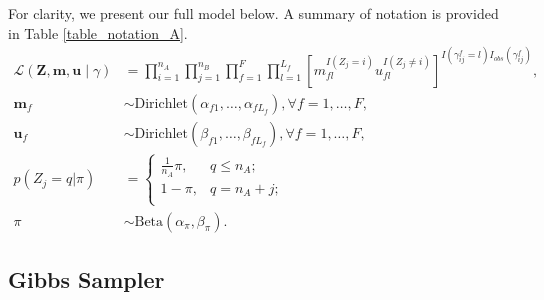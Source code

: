 \documentclass[ba]{imsart}
\begin{document}
For clarity, we present our full model below. A summary of notation is provided in Table \ref{table_notation_A}.
\begin{subequations}
\begin{align}
	\mathcal{L}(\bm{Z}, \bm{m}, \bm{u} \mid \gamma) &= \prod_{i=1}^{n_A}  \prod_{j=1}^{n_B}\prod_{f=1}^{F}\prod_{l=1}^{L_f}\left[  m_{fl}^{I(Z_j = i)}u_{fl}^{I(Z_j \neq i)}\right]^{I(\gamma_{ij}^f = l)I_{obs}(\gamma_{ij}^f)}, \label{eqn:likelihood}\\
	\bm{m}_f &\sim \text{Dirichlet}(\alpha_{f1}, \ldots, \alpha_{f L_f}), \forall f = 1, \ldots, F, \label{eqn:m} \\
	\bm{u}_f &\sim \text{Dirichlet}(\beta_{f1}, \ldots, \beta_{f L_f}),\forall f = 1, \ldots, F,  \label{eqn:u}\\
	p(Z_j = q| \pi)  &=
	\begin{cases} 
		\frac{1}{n_A}\pi,  & q \leq n_A; \\
		1-\pi, &  q  = n_A + j; \\
	\end{cases} \label{eqn:z}\\
	\pi &\sim \text{Beta}(\alpha_{\pi}, \beta_{\pi})\label{eqn:pi}.
\end{align}
\end{subequations}

\hypertarget{posterior-sampling}{%
	\subsection{Gibbs Sampler}
	\label{gibbs_sampling}}
\end{document}
